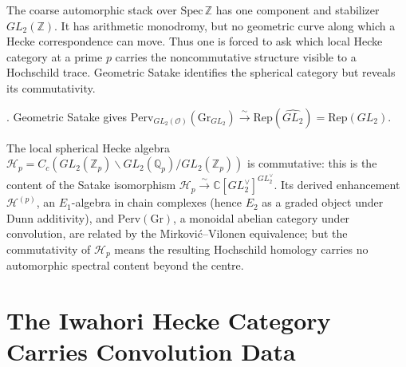 The coarse automorphic stack over \(\mathrm{Spec}\,\mathbb{Z}\) has one
component and stabilizer \(GL_{2}(\mathbb{Z})\). It has arithmetic
monodromy, but no geometric curve along which a Hecke correspondence
can move. Thus one is forced to ask which local Hecke category at a
prime \(p\) carries the noncommutative structure visible to a
Hochschild trace.
Geometric Satake identifies the spherical category but reveals its commutativity.

\begin{theorem}
\label{v4-arith:thm:mirkovic-vilonen}
\ClaimStatusProvedElsewhere. Geometric Satake gives
\(\mathrm{Perv}_{GL_{2}(\mathcal{O})}(\mathrm{Gr}_{GL_{2}})\xrightarrow{\sim}\mathrm{Rep}(\widehat{GL_{2}})=\mathrm{Rep}(GL_{2})\).
\end{theorem}

\begin{observation}
\label{v4-arith:obs:type-mismatch-perv-VA}
The local spherical Hecke algebra \(\mathcal{H}_{p}=C_{c}(GL_{2}(\mathbb{Z}_{p})\backslash
GL_{2}(\mathbb{Q}_{p})/GL_{2}(\mathbb{Z}_{p}))\) is commutative: this is the content
of the Satake isomorphism \(\mathcal{H}_p \xrightarrow{\sim} \mathbb{C}[GL_2^\vee]^{GL_2^\vee}\).
Its derived enhancement \(\mathcal{H}^{(p)}\), an \(E_{1}\)-algebra in chain complexes
(hence \(E_{2}\) as a graded object under Dunn additivity), and \(\mathrm{Perv}(\mathrm{Gr})\),
a monoidal abelian category under convolution, are related by the Mirković--Vilonen equivalence;
but the commutativity of \(\mathcal{H}_p\) means the resulting Hochschild homology carries no
automorphic spectral content beyond the centre.
\end{observation}

\section{The Iwahori Hecke Category Carries Convolution Data}
\label{v4-arith:bb:iwahori-carries-OPE}

